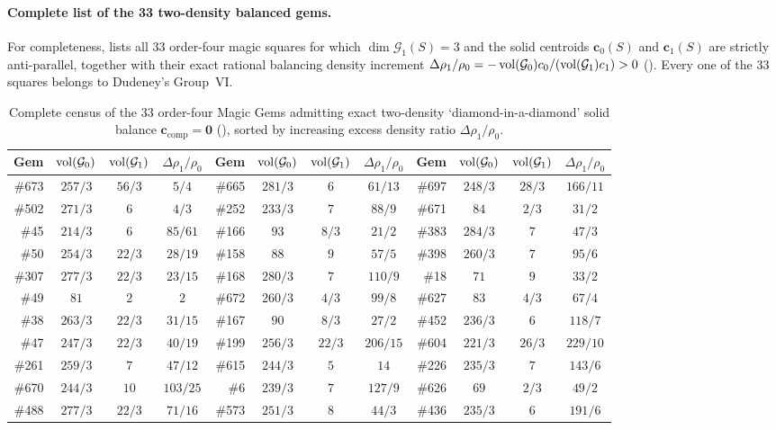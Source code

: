 \paragraph{Complete list of the 33 two-density balanced gems.}
For completeness,  lists all $33$ order-four magic squares for which $\dim\mathcal G_1(S)=3$ and the solid centroids $\mathbf c_0(S)$ and $\mathbf c_1(S)$ are strictly anti-parallel, together with their exact rational balancing density increment $\Delta\rho_1/\rho_0=-\operatorname{vol}(\mathcal G_0)c_0/(\operatorname{vol}(\mathcal G_1)c_1)>0$ (). Every one of the $33$ squares belongs to Dudeney's Group~VI.

\begin{table}[htbp]
\centering
\caption{Complete census of the $33$ order-four Magic Gems admitting exact two-density `diamond-in-a-diamond' solid balance $\mathbf c_{\mathrm{comp}}=\mathbf 0$ (), sorted by increasing excess density ratio $\Delta\rho_1/\rho_0$.}
\label{tab:all33}
\scriptsize
\setlength{\tabcolsep}{4.5pt}
\begin{tabular}{r c c c | r c c c | r c c c}
\toprule
Gem & $\operatorname{vol}(\mathcal G_0)$ & $\operatorname{vol}(\mathcal G_1)$ & $\Delta\rho_1/\rho_0$ &
Gem & $\operatorname{vol}(\mathcal G_0)$ & $\operatorname{vol}(\mathcal G_1)$ & $\Delta\rho_1/\rho_0$ &
Gem & $\operatorname{vol}(\mathcal G_0)$ & $\operatorname{vol}(\mathcal G_1)$ & $\Delta\rho_1/\rho_0$\\
\midrule
\#673 & $257/3$ & $56/3$ & $5/4$   & \#665 & $281/3$ & $6$    & $61/13$  & \#697 & $248/3$ & $28/3$ & $166/11$\\
\#502 & $271/3$ & $6$    & $4/3$   & \#252 & $233/3$ & $7$    & $88/9$   & \#671 & $84$    & $2/3$  & $31/2$\\
\#45  & $214/3$ & $6$    & $85/61$ & \#166 & $93$    & $8/3$  & $21/2$   & \#383 & $284/3$ & $7$    & $47/3$\\
\#50  & $254/3$ & $22/3$ & $28/19$ & \#158 & $88$    & $9$    & $57/5$   & \#398 & $260/3$ & $7$    & $95/6$\\
\#307 & $277/3$ & $22/3$ & $23/15$ & \#168 & $280/3$ & $7$    & $110/9$  & \#18  & $71$    & $9$    & $33/2$\\
\#49  & $81$    & $2$    & $2$     & \#672 & $260/3$ & $4/3$  & $99/8$   & \#627 & $83$    & $4/3$  & $67/4$\\
\#38  & $263/3$ & $22/3$ & $31/15$ & \#167 & $90$    & $8/3$  & $27/2$   & \#452 & $236/3$ & $6$    & $118/7$\\
\#47  & $247/3$ & $22/3$ & $40/19$ & \#199 & $256/3$ & $22/3$ & $206/15$ & \#604 & $221/3$ & $26/3$ & $229/10$\\
\#261 & $259/3$ & $7$    & $47/12$ & \#615 & $244/3$ & $5$    & $14$     & \#226 & $235/3$ & $7$    & $143/6$\\
\#670 & $244/3$ & $10$   & $103/25$& \#6   & $239/3$ & $7$    & $127/9$  & \#626 & $69$    & $2/3$  & $49/2$\\
\#488 & $277/3$ & $22/3$ & $71/16$ & \#573 & $251/3$ & $8$    & $44/3$   & \#436 & $235/3$ & $6$    & $191/6$\\
\bottomrule
\end{tabular}
\end{table}
